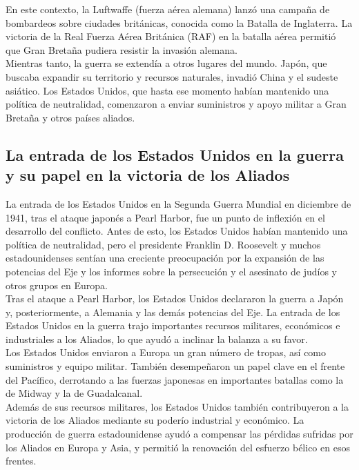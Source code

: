 \documentclass{article}
\theoremstyle{mytheoremstyle}
\theoremstyle{mytheoremstyle}
\theoremstyle{myproblemstyle}
\begin{document}
En este contexto, la Luftwaffe (fuerza aérea alemana) lanzó una campaña de bombardeos sobre ciudades británicas, conocida como la Batalla de Inglaterra. La victoria de la Real Fuerza Aérea Británica (RAF) en la batalla aérea permitió que Gran Bretaña pudiera resistir la invasión alemana.\\

Mientras tanto, la guerra se extendía a otros lugares del mundo. Japón, que buscaba expandir su territorio y recursos naturales, invadió China y el sudeste asiático. Los Estados Unidos, que hasta ese momento habían mantenido una política de neutralidad, comenzaron a enviar suministros y apoyo militar a Gran Bretaña y otros países aliados.\\

\subsection{La entrada de los Estados Unidos en la guerra y su papel en la victoria de los Aliados}

La entrada de los Estados Unidos en la Segunda Guerra Mundial en diciembre de 1941, tras el ataque japonés a Pearl Harbor, fue un punto de inflexión en el desarrollo del conflicto. Antes de esto, los Estados Unidos habían mantenido una política de neutralidad, pero el presidente Franklin D. Roosevelt y muchos estadounidenses sentían una creciente preocupación por la expansión de las potencias del Eje y los informes sobre la persecución y el asesinato de judíos y otros grupos en Europa.\\

Tras el ataque a Pearl Harbor, los Estados Unidos declararon la guerra a Japón y, posteriormente, a Alemania y las demás potencias del Eje. La entrada de los Estados Unidos en la guerra trajo importantes recursos militares, económicos e industriales a los Aliados, lo que ayudó a inclinar la balanza a su favor.\\

Los Estados Unidos enviaron a Europa un gran número de tropas, así como suministros y equipo militar. También desempeñaron un papel clave en el frente del Pacífico, derrotando a las fuerzas japonesas en importantes batallas como la de Midway y la de Guadalcanal.\\

Además de sus recursos militares, los Estados Unidos también contribuyeron a la victoria de los Aliados mediante su poderío industrial y económico. La producción de guerra estadounidense ayudó a compensar las pérdidas sufridas por los Aliados en Europa y Asia, y permitió la renovación del esfuerzo bélico en esos frentes.\\
\end{document}

